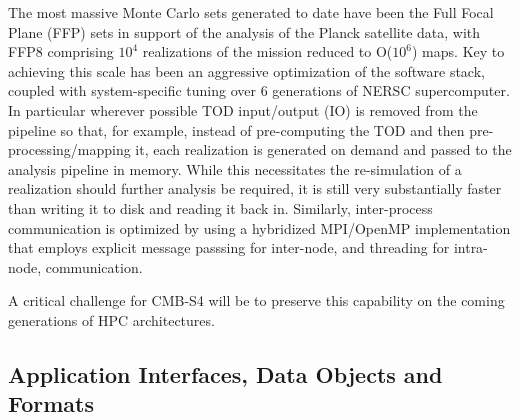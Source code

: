 The most massive Monte Carlo sets generated to date have been the Full Focal Plane (FFP) sets in support of the analysis of the Planck satellite data, with FFP8 comprising $10^4$ realizations of the mission reduced to O($10^6$) maps. Key to achieving this scale has been an aggressive optimization of the software stack, coupled with system-specific tuning over 6 generations of NERSC supercomputer. In particular wherever possible TOD input/output (IO) is removed from the pipeline so that, for example, instead of pre-computing the TOD and then pre-processing/mapping it, each realization is generated on demand and passed to the analysis pipeline in memory. While this necessitates the re-simulation of a realization should further analysis be required, it is still very substantially faster than writing it to disk and reading it back in. Similarly, inter-process communication is optimized by using a hybridized MPI/OpenMP implementation that employs explicit message passsing for inter-node, and threading for intra-node, communication.

A critical challenge for CMB-S4 will be to preserve this capability on the coming generations of HPC architectures. 


\subsection{Application Interfaces, Data Objects and Formats}

%



